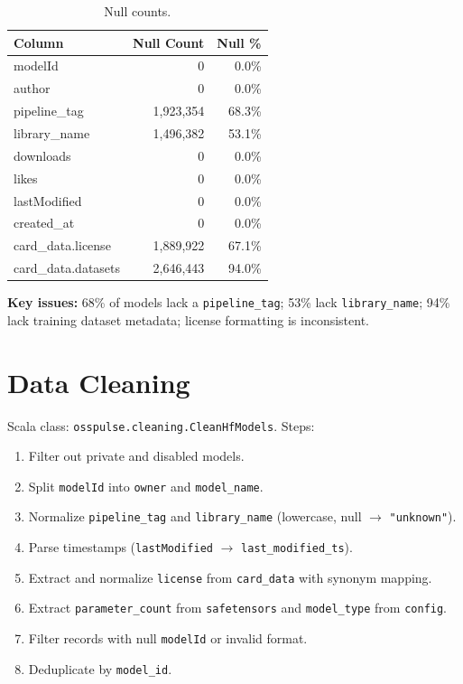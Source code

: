 \documentclass[11pt]{article}
\begin{document}
\begin{table}[H]
\centering
\begin{tabular}{lrr}
\toprule
\textbf{Column} & \textbf{Null Count} & \textbf{Null \%} \\
\midrule
modelId            & 0         & 0.0\% \\
author             & 0         & 0.0\% \\
pipeline\_tag      & 1,923,354 & 68.3\% \\
library\_name      & 1,496,382 & 53.1\% \\
downloads          & 0         & 0.0\% \\
likes              & 0         & 0.0\% \\
lastModified       & 0         & 0.0\% \\
created\_at        & 0         & 0.0\% \\
card\_data.license & 1,889,922 & 67.1\% \\
card\_data.datasets & 2,646,443 & 94.0\% \\
\bottomrule
\end{tabular}
\caption{Null counts.}
\end{table}

\textbf{Key issues:} 68\% of models lack a \texttt{pipeline\_tag}; 53\% lack \texttt{library\_name}; 94\% lack training dataset metadata; license formatting is inconsistent.

\section{Data Cleaning}

Scala class: \texttt{osspulse.cleaning.CleanHfModels}. Steps:

\begin{enumerate}
  \item Filter out private and disabled models.
  \item Split \texttt{modelId} into \texttt{owner} and \texttt{model\_name}.
  \item Normalize \texttt{pipeline\_tag} and \texttt{library\_name} (lowercase, null $\to$ \texttt{"unknown"}).
  \item Parse timestamps (\texttt{lastModified} $\to$ \texttt{last\_modified\_ts}).
  \item Extract and normalize \texttt{license} from \texttt{card\_data} with synonym mapping.
  \item Extract \texttt{parameter\_count} from \texttt{safetensors} and \texttt{model\_type} from \texttt{config}.
  \item Filter records with null \texttt{modelId} or invalid format.
  \item Deduplicate by \texttt{model\_id}.
\end{enumerate}
\end{document}
